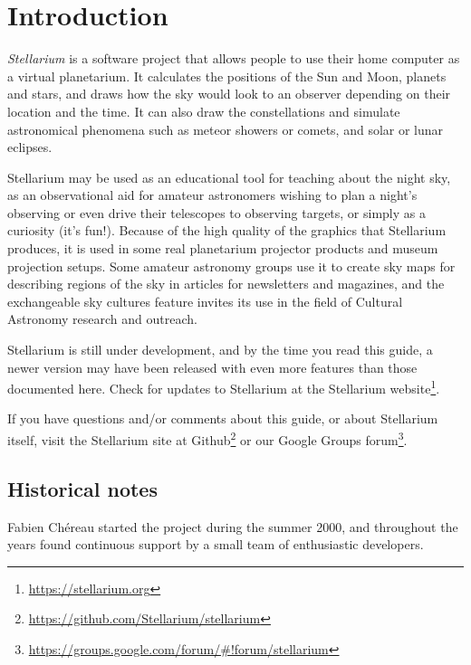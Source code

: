 

\chapter{Introduction}
\label{ch:Introduction}

\emph{Stellarium} is a software project that allows people to use their
home computer as a virtual planetarium. It calculates the positions of
the Sun and Moon, planets and stars, and draws how the sky would look to
an observer depending on their location and the time. It can also draw
the constellations and simulate astronomical phenomena such as meteor
showers or comets, and solar or lunar eclipses.

Stellarium may be used as an educational tool for teaching about the
night sky, as an observational aid for amateur astronomers wishing to
plan a night's observing or even drive their telescopes to observing
targets, or simply as a curiosity (it's fun!). Because of the high
quality of the graphics that Stellarium produces, it is used in some
real planetarium projector products and museum projection setups. Some
amateur astronomy groups use it to create sky maps for describing
regions of the sky in articles for newsletters and magazines, and the
exchangeable sky cultures feature invites its use in the field of
Cultural Astronomy research and outreach.

Stellarium is still under development, and by the time you read
this guide, a newer version may have been released with even more
features than those documented here. Check for updates to Stellarium at
the Stellarium website\footnote{\url{https://stellarium.org}}.

If you have questions and/or comments about this guide, or about
Stellarium itself, visit the Stellarium site at
Github\footnote{\url{https://github.com/Stellarium/stellarium}} or our
Google Groups
forum\footnote{\url{https://groups.google.com/forum/#!forum/stellarium}}.


\section{Historical notes}
\label{sec:Introduction:HistoricalNotes}

Fabien Ch\'ereau started the project during the summer 2000, and throughout
the years found continuous support by a small team of enthusiastic developers.

